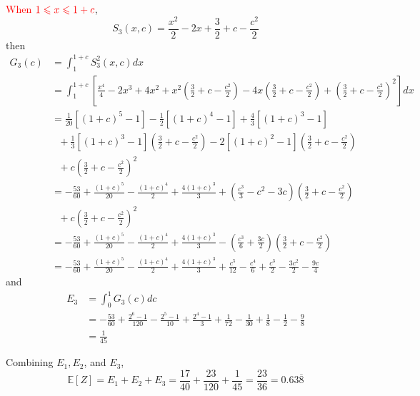 \documentclass[12pt]{simple_doc}
\begin{document}
    \textcolor{red}{When} $\color{red} 1 \leqslant x \leqslant 1 + c$,
    \begin{equation*}
        S_3(x, c) = \frac{x^2}{2} - 2x + \frac{3}{2} + c - \frac{c^2}{2}
    \end{equation*}
    then
    \begin{equation*}
		\begin{aligned}
		G_3(c) &= \int_1^{1+c} S_3^2(x, c) dx \\
		   &= \int_1^{1+c} [\frac{x^4}{4} - 2x^3 + 4x^2 + x^2(\frac{3}{2} + c - \frac{c^2}{2})
              -4x(\frac{3}{2} + c - \frac{c^2}{2}) + (\frac{3}{2} + c - \frac{c^2}{2})^2] dx\\
           &= \frac{1}{20}[(1+c)^5 - 1] - \frac{1}{2}[(1+c)^4 - 1] + \frac{4}{3}[(1+c)^3 - 1]\\
           &\ \ \ + \frac{1}{3}[(1+c)^3 - 1](\frac{3}{2} + c - \frac{c^2}{2})
              - 2[(1+c)^2 - 1](\frac{3}{2} + c - \frac{c^2}{2})\\
           &\ \ \ + c(\frac{3}{2} + c - \frac{c^2}{2})^2\\
           &= -\frac{53}{60} + \frac{(1+c)^5}{20} - \frac{(1+c)^4}{2} + \frac{4(1+c)^3}{3}
              + (\frac{c^3}{3} - c^2 -3c)(\frac{3}{2} + c - \frac{c^2}{2})\\
           &\ \ \ + c(\frac{3}{2} + c - \frac{c^2}{2})^2\\
           &= -\frac{53}{60} + \frac{(1+c)^5}{20} - \frac{(1+c)^4}{2} + \frac{4(1+c)^3}{3}
              - (\frac{c^3}{6} + \frac{3c}{2})(\frac{3}{2} + c - \frac{c^2}{2})\\
           &= -\frac{53}{60} + \frac{(1+c)^5}{20} - \frac{(1+c)^4}{2} + \frac{4(1+c)^3}{3}
              + \frac{c^5}{12} - \frac{c^4}{6} + \frac{c^3}{2} - \frac{3c^2}{2} - \frac{9c}{4}
		\end{aligned}
	\end{equation*}
    and
    \begin{equation*}
		\begin{aligned}
		E_3 &= \int_0^1 G_3(c) dc \\
		   &= -\frac{53}{60} + \frac{2^6-1}{120} - \frac{2^5-1}{10} + \frac{2^4-1}{3}
                + \frac{1}{72} - \frac{1}{30} + \frac{1}{8} - \frac{1}{2} - \frac{9}{8} \\
           &= \frac{1}{45}
		\end{aligned}
	\end{equation*}

    Combining $E_1, E_2$, and $E_3$,
    \begin{equation*}
        \mathbb{E}[Z] = E_1 + E_2 + E_3 = \frac{17}{40} + \frac{23}{120} + \frac{1}{45}
                      = \frac{23}{36} = 0.63\overline{8}
    \end{equation*}
\end{document}
